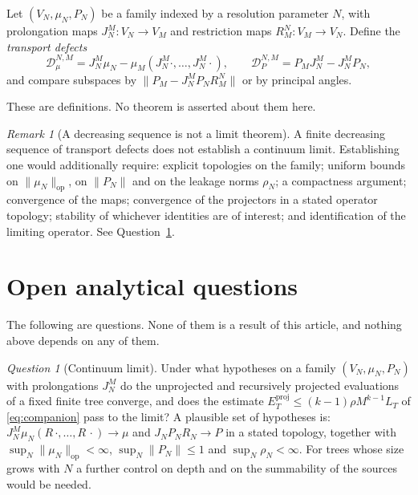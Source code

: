 \documentclass[11pt]{amsart}
\theoremstyle{definition}
\theoremstyle{remark}
\newtheorem{remark}[theorem]{Remark}
\newtheorem{question}[theorem]{Question}
\newcommand{\op}{\mathrm{op}}
\newcommand{\norm}[1]{\lVert#1\rVert}
\newcommand{\proj}{\mathrm{proj}}
\begin{document}
Let $(V_N,\mu_N,P_N)$ be a family indexed by a resolution parameter $N$, with prolongation
maps $J_N^{M}:V_N\to V_M$ and restriction maps $R_M^{N}:V_M\to V_N$. Define the
\emph{transport defects}
\[
 \mathcal D_\mu^{N,M}=J_N^{M}\mu_N-\mu_M(J_N^{M}\cdot,\ldots,J_N^{M}\cdot),
 \qquad
 \mathcal D_P^{N,M}=P_MJ_N^{M}-J_N^{M}P_N,
\]
and compare subspaces by $\norm{P_M-J_N^{M}P_NR_M^{N}}$ or by principal angles.

These are definitions. No theorem is asserted about them here.

\begin{remark}[A decreasing sequence is not a limit theorem]
\label{rem:nolimit}
A finite decreasing sequence of transport defects does not establish a continuum limit.
Establishing one would additionally require: explicit topologies on the family; uniform
bounds on $\norm{\mu_N}_{\op}$, on $\norm{P_N}$ and on the leakage norms $\rho_N$; a
compactness argument; convergence of the maps; convergence of the projectors in a stated
operator topology; stability of whichever identities are of interest; and identification
of the limiting operator. See Question~\ref{q:continuum}.
\end{remark}

\section{Open analytical questions}
\label{sec:open}

The following are questions. None of them is a result of this article, and nothing above
depends on any of them.

\begin{question}[Continuum limit]
\label{q:continuum}
Under what hypotheses on a family $(V_N,\mu_N,P_N)$ with prolongations $J_N^{M}$ do the
unprojected and recursively projected evaluations of a fixed finite tree converge, and does
the estimate $E_T^{\proj}\le(k-1)\rho M^{k-1}L_T$ of \eqref{eq:companion} pass to the
limit? A plausible set of hypotheses is: $J_N^{M}\mu_N(R\,\cdot,\ldots,R\,\cdot)\to\mu$ and
$J_N P_N R_N\to P$ in a stated topology, together with
$\sup_N\norm{\mu_N}_{\op}<\infty$, $\sup_N\norm{P_N}\le1$ and $\sup_N\rho_N<\infty$. For
trees whose size grows with $N$ a further control on depth and on the summability of the
sources would be needed.
\end{question}
\end{document}
